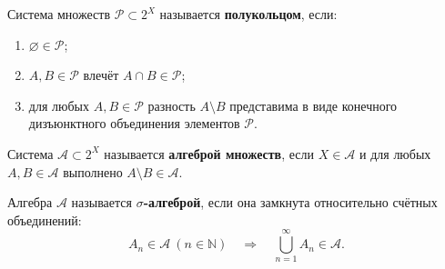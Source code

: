 \label{definition:09}

\begin{definition}
Система множеств $\mathcal P\subset2^X$ называется \textbf{полукольцом}, если:
\begin{enumerate}
  \item $\varnothing\in\mathcal P$;
  \item $A,B\in\mathcal P$ влечёт $A\cap B\in\mathcal P$;
  \item для любых $A,B\in\mathcal P$ разность $A\setminus B$ представима в виде конечного дизъюнктного объединения элементов $\mathcal P$.
\end{enumerate}
\end{definition}

\begin{definition}
Система $\mathcal A\subset2^X$ называется \textbf{алгеброй множеств}, если $X\in\mathcal A$ и для любых $A,B\in\mathcal A$ выполнено $A\setminus B\in\mathcal A$.
\end{definition}

\begin{definition}
Алгебра $\mathcal A$ называется \textbf{$\sigma$-алгеброй}, если она замкнута относительно счётных объединений:
\[
  A_n\in\mathcal A\ (n\in\mathbb N)
  \quad\Longrightarrow\quad
  \bigcup_{n=1}^{\infty}A_n\in\mathcal A.
\]
\end{definition}
